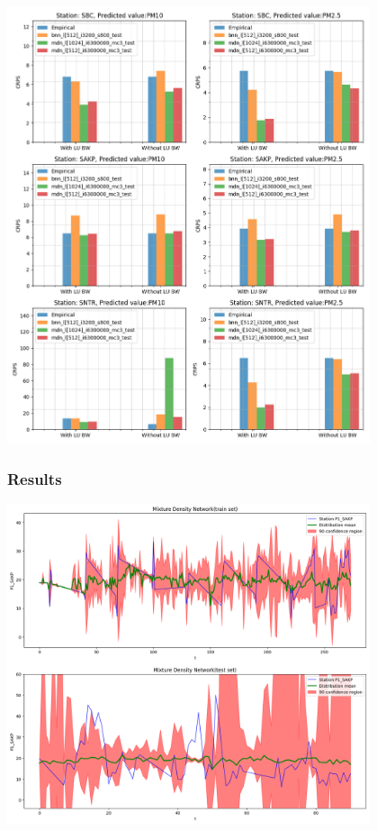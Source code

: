 \documentclass[18pt]{beamer}
\begin{document}
\begin{frame}[t]
  \begin{center}
    \vspace*{-0.2in}
    \includegraphics[height=0.75\textwidth, width=0.8\textwidth ]{images/1h/results_plot_CRPS}
  \end{center}
\end{frame}


\begin{frame}[t]
  \frametitle{Results}
  \begin{center}
    \vspace*{-0.2in}
    \includegraphics[height=0.65\textwidth, width=0.8\textwidth ]{images/mdn-bad}
  \end{center}
\end{frame}
\end{document}
